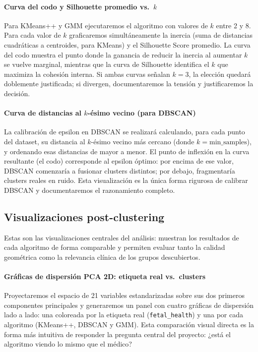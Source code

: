 \documentclass[12pt,letterpaper]{article}
\begin{document}
\paragraph{Curva del codo y Silhouette promedio vs.\ $k$}
Para K\-Means++ y GMM ejecutaremos el algoritmo con valores de $k$ entre 2 y 8. Para cada valor de
$k$ graficaremos simultáneamente la inercia (suma de distancias cuadráticas a centroides, para
K\-Means) y el Silhouette Score promedio. La curva del codo muestra el punto donde la ganancia de
reducir la inercia al aumentar $k$ se vuelve marginal, mientras que la curva de Silhouette
identifica el $k$ que maximiza la cohesión interna. Si ambas curvas señalan $k = 3$, la elección
quedará doblemente justificada; si divergen, documentaremos la tensión y justificaremos la decisión.

\paragraph{Curva de distancias al $k$-ésimo vecino (para DBSCAN)}
La calibración de epsilon en DBSCAN se realizará calculando, para cada punto del dataset, su
distancia al $k$-ésimo vecino más cercano (donde $k = \text{min\_samples}$), y ordenando esas
distancias de mayor a menor. El punto de inflexión en la curva resultante (el codo) corresponde
al epsilon óptimo: por encima de ese valor, DBSCAN comenzaría a fusionar clusters distintos; por
debajo, fragmentaría clusters reales en ruido. Esta visualización es la única forma rigurosa de
calibrar DBSCAN y documentaremos el razonamiento completo.

\subsection{Visualizaciones post-clustering}

Estas son las visualizaciones centrales del análisis: muestran los resultados de cada algoritmo de
forma comparable y permiten evaluar tanto la calidad geométrica como la relevancia clínica de los
grupos descubiertos.

\paragraph{Gráficas de dispersión PCA 2D: etiqueta real vs.\ clusters}
Proyectaremos el espacio de 21 variables estandarizadas sobre sus dos primeros componentes
principales y generaremos un panel con cuatro gráficas de dispersión lado a lado: una coloreada
por la etiqueta real (\texttt{fetal\_health}) y una por cada algoritmo (K\-Means++, DBSCAN y GMM).
Esta comparación visual directa es la forma más intuitiva de responder la pregunta central del
proyecto: ¿está el algoritmo viendo lo mismo que el médico?
\end{document}
